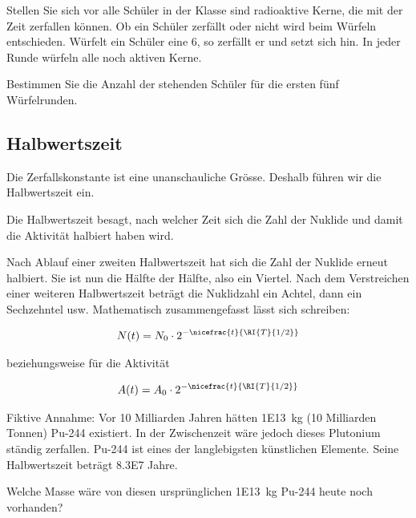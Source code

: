 \documentclass[12pt,a4paper,twoside]{article}
\begin{document}
\newpage
\begin{aufgabe}\label{ZerfallendeSchüler}
	Stellen Sie sich vor alle Schüler in der Klasse sind radioaktive Kerne, die mit der Zeit zerfallen können.
	Ob ein Schüler zerfällt oder nicht wird beim Würfeln entschieden. Würfelt ein Schüler eine 6, so zerfällt er und setzt sich hin.
    In jeder Runde würfeln alle noch aktiven Kerne.

Bestimmen Sie die Anzahl der stehenden Schüler für die ersten fünf Würfelrunden.
\end{aufgabe}

\subsection*{Halbwertszeit }

Die Zerfallskonstante ist eine unanschauliche Grösse. Deshalb führen wir die Halbwertszeit  ein.

Die Halbwertszeit besagt, nach welcher Zeit sich die Zahl der Nuklide und damit die Aktivität halbiert haben wird.

Nach Ablauf einer zweiten Halbwertszeit hat sich die Zahl der Nuklide erneut halbiert. 
Sie ist nun die Hälfte der Hälfte, also ein Viertel. Nach dem Verstreichen einer weiteren Halbwertszeit
beträgt die Nuklidzahl ein Achtel, dann ein Sechzehntel usw. Mathematisch zusammengefasst lässt sich schreiben:

\begin{eqnarray*}
	N(t) = N_0\cdot 2^{-\nicefrac{t}{\RI{T}{1/2}}}
\end{eqnarray*}

beziehungsweise für die Aktivität

\begin{eqnarray*}
	A(t) = A_0\cdot 2^{-\nicefrac{t}{\RI{T}{1/2}}}
\end{eqnarray*}

%
%
\begin{aufgabe}
	
Fiktive Annahme:
Vor 10 Milliarden Jahren hätten \SI{1E13}{kg} (10 Milliarden Tonnen) Pu-244 existiert. 
In der Zwischenzeit wäre jedoch dieses Plutonium ständig zerfallen. 
Pu-244 ist eines der langlebigsten künstlichen Elemente. Seine Halbwertszeit beträgt \num{8.3E7} Jahre.

Welche Masse wäre von diesen ursprünglichen \SI{1E13}{kg} Pu-244 heute noch vorhanden?
\end{aufgabe}
\end{document}
